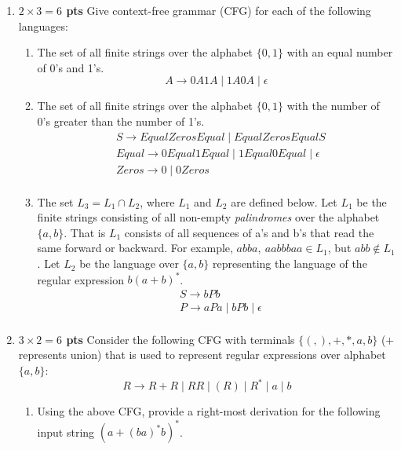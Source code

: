 \documentclass[10pt]{article}
\newcommand {\pts}[1]{{\bf #1 pts}}
\begin{document}
\begin{enumerate}
  \item  \pts{$2\times 3= 6$} Give context-free grammar (CFG) for each of the following languages:
  \begin{enumerate}
           \item The set of all finite strings over the alphabet $\{0,1\}$ with an equal number of 0's and 1's.
            \[
            A \rightarrow 0A1A \mid 1A0A \mid \epsilon
            \]
           \item The set of all finite strings over the alphabet $\{0,1\}$ with the number of 0's greater than the number of 1's.
            \begin{equation*}\begin{aligned}
            & S \rightarrow Equal Zeros Equal \mid Equal Zeros Equal S \\
            & Equal \rightarrow 0Equal1Equal \mid 1Equal0Equal \mid \epsilon \\
            & Zeros \rightarrow 0 \mid 0Zeros \\
            \end{aligned}\end{equation*}
           \item The set $L_3=L_1\cap L_2$, where $L_1$ and $L_2$ are defined below.
           Let $L_1$ be the finite strings consisting of all non-empty \emph{palindromes} over the alphabet $\{a,b\}$. That is $L_1$
           consists of all sequences of a's and b's that read the same forward or backward. For example, $abba,~aabbbaa\in L_1$, but $abb\not\in L_1$.
           Let $L_2$ be the language over  $\{a,b\}$ representing the language of the regular expression $b(a+b)^\ast$.
            \begin{equation*}\begin{aligned}
            & S \rightarrow bPb \\
            & P \rightarrow aPa \mid bPb \mid \epsilon \\
            \end{aligned}\end{equation*}
  \end{enumerate}
  \newpage
  \item \pts{$3\times 2= 6$} Consider the following CFG with terminals $\{(,),+,*,a,b\}$ ($+$ represents union) that is used to represent
regular expressions over alphabet $\{a, b\}$:
\[R\rightarrow R+R \mid RR\mid (R)\mid R^\ast \mid a\mid b\]
\begin{enumerate}
  \item Using the above CFG, provide a right-most derivation for the following input string $(a+(ba)^\ast b)^\ast$.

\end{enumerate}
\end{enumerate}
\end{document}
